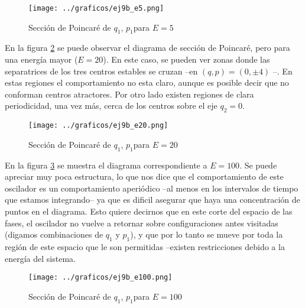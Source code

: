 \documentclass[a4paper,10pt]{paper}
\begin{document}
\begin{figure}[H]
 \centering
 \texttt{[image: ../graficos/ej9b\_e5.png]}
 \caption{Secci\'on de Poincar\'e de $q_1$, $p_1$para $E=5$}
 \label{fig:ej9b5}
\end{figure}

En la figura \ref{fig:ej9b20} se puede observar el diagrama de secci\'on de Poincar\'e, pero para una 
energ\'{i}a mayor ($E=20$). En este caso, se pueden ver zonas donde las separatrices de los tres centros estables
se cruzan --en $(q, p) = (0, \pm 4)$ --. En estas regiones el comportamiento no esta claro, aunque es posible
decir que no conforman centros atractores. Por otro lado existen regiones de clara periodicidad, una vez m\'as, cerca
de los centros sobre el eje $q_2 = 0$.

\begin{figure}[H]
 \centering
 \texttt{[image: ../graficos/ej9b\_e20.png]}
 \caption{Secci\'on de Poincar\'e de $q_1$, $p_1$para $E=20$}
 \label{fig:ej9b20}
\end{figure}

En la figura \ref{fig:ej9b100} se muestra el diagrama correspondiente a $E=100$. Se puede apreciar muy poca estructura, 
lo que nos dice que el comportamiento de este oscilador es un comportamiento aperi\'odico --al menos en los intervalos de 
tiempo que estamos integrando-- ya que es dificil asegurar que haya una concentraci\'on de puntos en el diagrama.
Esto quiere decirnos que en este corte del espacio de las fases, el oscilador no vuelve a retornar sobre configuraciones
antes visitadas (digamos combinaciones de $q_1$ y $p_1$), y que por lo tanto se mueve por toda la regi\'on de este espacio
que le son permitidas --existen restricciones debido a la energ\'{i}a del sistema.

\begin{figure}[H]
 \centering
 \texttt{[image: ../graficos/ej9b\_e100.png]}
 \caption{Secci\'on de Poincar\'e de $q_1$, $p_1$para $E=100$}
 \label{fig:ej9b100}
\end{figure}
\end{document}
